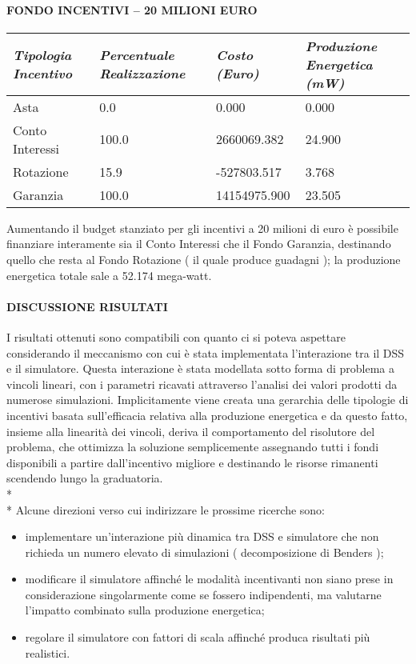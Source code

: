 \documentclass[12pt,a4paper,openright,twoside]{report}
\begin{document}
\paragraph{FONDO INCENTIVI – 20 MILIONI EURO}
\begin{center}
	\begin{tabular}{ | p{3.5cm} | p{3.5cm} | p{3.5cm} | p{3.5cm} | }
		\hline
		\nohyphens{\emph{Tipologia Incentivo}} & \nohyphens{\emph{Percentuale Realizzazione}} & \nohyphens{\emph{Costo (Euro)}} & \nohyphens{\emph{Produzione Energetica (mW)}} \\ \hline 
		Asta & 0.0 & 0.000 & 0.000 \\ \hline
		Conto Interessi & 100.0 & 2660069.382 & 24.900 \\ \hline
		Rotazione & 15.9 & -527803.517 & 3.768 \\ \hline
		Garanzia & 100.0 & 14154975.900 & 23.505 \\
		\hline
	\end{tabular}
\end{center}
Aumentando il budget stanziato per gli incentivi a 20 milioni di euro è possibile finanziare interamente sia il Conto Interessi che il Fondo Garanzia, destinando quello che resta al Fondo Rotazione ( il quale produce guadagni ); la produzione energetica totale sale a 52.174 mega-watt.
\paragraph{DISCUSSIONE RISULTATI}
I risultati ottenuti sono compatibili con quanto ci si poteva aspettare considerando  il meccanismo con cui è stata implementata l'interazione tra il DSS e il simulatore. Questa interazione è stata modellata sotto forma di problema a vincoli lineari, con i parametri ricavati attraverso l'analisi dei valori prodotti da numerose simulazioni.
Implicitamente viene creata una gerarchia delle tipologie di incentivi basata sull'efficacia relativa alla produzione energetica e da questo fatto, insieme alla linearità dei vincoli, deriva il comportamento del risolutore del problema, che ottimizza la soluzione semplicemente assegnando tutti i fondi disponibili a partire dall'incentivo migliore e destinando le risorse rimanenti scendendo lungo la graduatoria. 
\\* \\*
Alcune direzioni verso cui indirizzare le prossime ricerche sono:
\begin{itemize}
	\item implementare un'interazione più dinamica tra DSS e simulatore che non richieda un numero elevato di simulazioni ( decomposizione di Benders );
	\item modificare il simulatore affinché le modalità incentivanti non siano prese in considerazione singolarmente come se fossero indipendenti, ma valutarne l'impatto combinato sulla produzione energetica;
	\item regolare il simulatore con fattori di scala affinché produca risultati più realistici.
\end{itemize}
\end{document}
